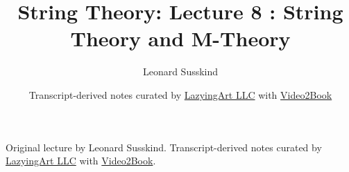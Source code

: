 \documentclass[11pt,oneside]{book}
\begin{document}
\frontmatter
\title{String Theory: Lecture 8 : String Theory and M-Theory}
\author{Leonard Susskind}
\date{Transcript-derived notes curated by \href{https://lazying.art}{LazyingArt LLC} with \href{https://github.com/lachlanchen/Video2Book}{Video2Book}}
\maketitle
\begin{center}
\small Original lecture by Leonard Susskind. Transcript-derived notes curated by \href{https://lazying.art}{LazyingArt LLC} with \href{https://github.com/lachlanchen/Video2Book}{Video2Book}.
\end{center}
\clearpage
\mainmatter

\end{document}
